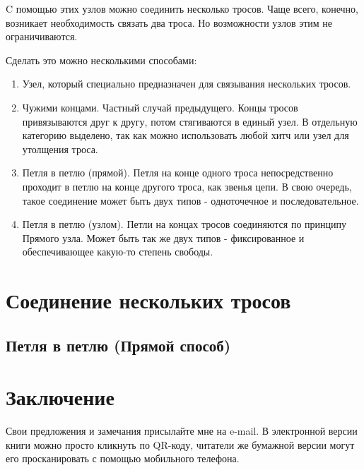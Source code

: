 \documentclass{book}
\begin{document}
\lettrine[lines=3,loversize=0.2,nindent=4pt,slope=0pt]{C}{} помощью этих узлов можно соединить несколько тросов. Чаще всего, конечно, возникает необходимость связать два троса. Но возможности узлов этим не ограничиваются.

Сделать это можно несколькими способами:

\begin{enumerate}
\item Узел, который специально предназначен для связывания нескольких тросов.
\item Чужими концами. Частный случай предыдущего. Концы тросов привязываются друг к другу, потом стягиваются в единый узел. В отдельную категорию выделено, так как можно использовать любой хитч или узел для утолщения троса. %
\item Петля в петлю (прямой). Петля на конце одного троса непосредственно проходит в петлю на конце другого троса, как звенья цепи. В свою очередь, такое соединение может быть двух типов - одноточечное и последовательное.
\item Петля в петлю (узлом). Петли на концах тросов соединяются по принципу Прямого узла. Может быть так же двух типов - фиксированное и обеспечивающее какую-то степень свободы.
\end{enumerate}

\chapter{Соединение нескольких тросов}

\section{Петля в петлю (Прямой способ)} %






\chapter*{Заключение}

\begin{figure}
\vspace{-3ex}
\end{figure}

Свои предложения и замечания присылайте мне на e-mail. В электронной версии книги можно просто кликнуть по QR-коду, читатели же бумажной версии могут его просканировать с помощью мобильного телефона.
\end{document}
